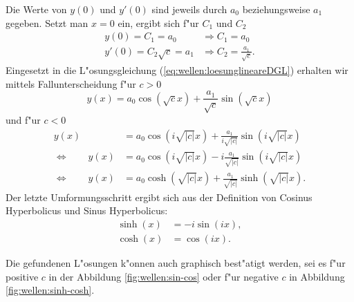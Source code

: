 Die Werte von $y(0)$ und $y'(0)$ sind jeweils durch $a_0$ beziehungsweise $a_1$ 
gegeben. Setzt man $x = 0$ ein, ergibt sich f"ur $C_1$ und $C_2$
\begin{equation*}
	\begin{split}
		y(0) = C_1 = a_0 &\Rightarrow C_1 = a_0 \\
		y'(0) = C_2 \sqrt{c} = a_1 &\Rightarrow C_2 = \frac{a_1}{\sqrt{c}}.
	\end{split}
\end{equation*}
Eingesetzt in die L"osungsgleichung (\ref{eq:wellen:loesunglineareDGL}) 
erhalten wir mittels Fallunterscheidung f"ur $c > 0$
\begin{equation*}
	y(x) = a_0 \cos(\sqrt{c}x) + \frac{a_1}{\sqrt{c}} \sin(\sqrt{c}x)
\end{equation*}
und f"ur $c < 0$
\begin{equation*}
	\begin{split}
		y(x) &= a_0 \cos(i\sqrt{|c|}x) + 
		\frac{a_1}{i\sqrt{|c|}}\sin(i\sqrt{|c|}x)\\
		\Leftrightarrow \qquad
		y(x) &= a_0 \cos(i\sqrt{|c|}x) - 
		i\frac{a_1}{\sqrt{|c|}}\sin(i\sqrt{|c|}x)\\
		\Leftrightarrow \qquad
		y(x) &= a_0 \cosh(\sqrt{|c|}x) + 
		\frac{a_1}{\sqrt{|c|}}\sinh(\sqrt{|c|}x).
	\end{split}	
\end{equation*}
Der letzte Umformungsschritt ergibt sich aus der Definition von Cosinus 
Hyperbolicus und Sinus Hyperbolicus:
\begin{equation*}
	\begin{split}
		\sinh(x) &= -i \sin(ix),\\
		\cosh(x) &= \cos (ix).
	\end{split}
\end{equation*}

Die gefundenen L"osungen k"onnen auch graphisch best"atigt werden, sei es f"ur 
positive $c$ in der Abbildung \ref{fig:wellen:sin-cos} oder f"ur negative $c$ 
in Abbildung \ref{fig:wellen:sinh-cosh}.

